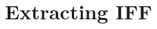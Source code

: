 \documentclass[abstract = on,listof=totoc, bibliography=totoc]{scrreprt}
\begin{document}
%
%
%     
%
%
%
\section{Extracting IFF}
\label{sec:extractIFF}
\end{document}
